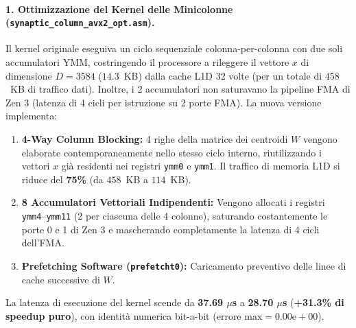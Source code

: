 \documentclass[10pt,a4paper]{article}
\theoremstyle{definition}
\begin{document}
\paragraph{1. Ottimizzazione del Kernel delle Minicolonne (\texttt{synaptic\_column\_avx2\_opt.asm}).}
Il kernel originale eseguiva un ciclo sequenziale colonna-per-colonna con due soli accumulatori YMM, costringendo il processore a rileggere il vettore $x$ di dimensione $D=3584$ ($14.3$~KB) dalla cache L1D 32 volte (per un totale di $458$~KB di traffico dati). Inoltre, i 2 accumulatori non saturavano la pipeline FMA di Zen 3 (latenza di 4 cicli per istruzione su 2 porte FMA). 
La nuova versione implementa:
\begin{enumerate}[leftmargin=1.5em]
    \item \textbf{4-Way Column Blocking:} 4 righe della matrice dei centroidi $W$ vengono elaborate contemporaneamente nello stesso ciclo interno, riutilizzando i vettori $x$ già residenti nei registri \texttt{ymm0} e \texttt{ymm1}. Il traffico di memoria L1D si riduce del \textbf{75\%} (da $458$~KB a $114$~KB).
    \item \textbf{8 Accumulatori Vettoriali Indipendenti:} Vengono allocati i registri \texttt{ymm4}--\texttt{ymm11} (2 per ciascuna delle 4 colonne), saturando costantemente le porte 0 e 1 di Zen 3 e mascherando completamente la latenza di 4 cicli dell'FMA.
    \item \textbf{Prefetching Software (\texttt{prefetcht0}):} Caricamento preventivo delle linee di cache successive di $W$.
\end{enumerate}
La latenza di esecuzione del kernel scende da \textbf{37.69 $\mu$s} a \textbf{28.70 $\mu$s} (\textbf{+31.3\% di speedup puro}), con identità numerica bit-a-bit ($\text{errore max} = 0.00\text{e}+00$).
\end{document}
